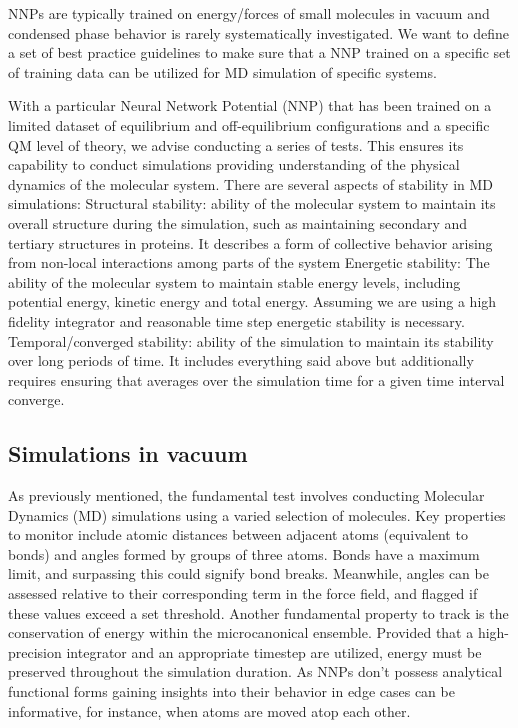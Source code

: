 \documentclass[9pt,bestpractices]{livecoms}
\begin{document}
NNPs are typically trained on energy/forces of small molecules in vacuum and condensed phase behavior is rarely systematically investigated. We want to define a set of best practice guidelines to make sure that a NNP trained on a specific set of training data can be utilized for MD simulation of specific systems. 

With a particular Neural Network Potential (NNP) that has been trained on a limited dataset of equilibrium and off-equilibrium configurations and a specific QM level of theory, we advise conducting a series of tests. This ensures its capability to conduct simulations providing understanding of the physical dynamics of the molecular system.
There are several aspects of stability in MD simulations:
Structural stability: ability of the molecular system to maintain its overall structure during the simulation, such as maintaining secondary and tertiary structures in proteins. It describes a form of collective behavior arising from non-local interactions among parts of the system
Energetic stability: The ability of the molecular system to maintain stable energy levels, including potential energy, kinetic energy and total energy. Assuming we are using a high fidelity integrator and reasonable time step energetic stability is necessary.
Temporal/converged stability: ability of the simulation to maintain its stability over long periods of time. It includes everything said above but additionally requires ensuring that averages over the simulation time for a given time interval converge.

\subsection{Simulations in vacuum}

As previously mentioned, the fundamental test involves conducting Molecular Dynamics (MD) simulations using a varied selection of molecules. Key properties to monitor include atomic distances between adjacent atoms (equivalent to bonds) and angles formed by groups of three atoms. Bonds have a maximum limit, and surpassing this could signify bond breaks. Meanwhile, angles can be assessed relative to their corresponding term in the force field, and flagged if these values exceed a set threshold.
Another fundamental property to track is the conservation of energy within the microcanonical ensemble. Provided that a high-precision integrator and an appropriate timestep are utilized, energy must be preserved throughout the simulation duration.
As NNPs don't possess analytical functional forms gaining insights into their behavior in edge cases can be informative, for instance, when atoms are moved atop each other.
\end{document}
